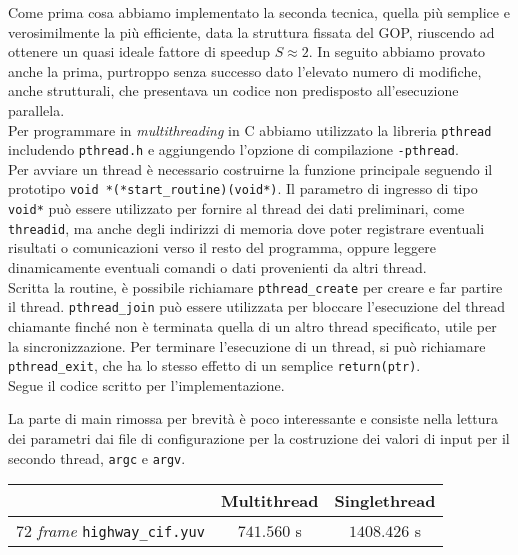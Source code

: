 Come prima cosa abbiamo implementato la seconda tecnica, quella più 
semplice e verosimilmente la più efficiente, data la struttura fissata del GOP, 
riuscendo ad ottenere un quasi ideale fattore di speedup $S \approx 2$. In 
seguito abbiamo provato anche la prima, purtroppo senza successo dato l'elevato 
numero di modifiche, anche strutturali, che presentava un codice non 
predisposto all'esecuzione parallela.
\\Per programmare in \emph{multithreading} in C abbiamo utilizzato la libreria 
\verb|pthread| includendo \verb|pthread.h| e aggiungendo l'opzione di 
compilazione \verb|-pthread|.\\
Per avviare un thread è necessario costruirne la funzione principale seguendo 
il prototipo \verb|void *(*start_routine)(void*)|. Il parametro di ingresso di 
tipo \verb|void*| può essere utilizzato per fornire al thread dei dati 
preliminari, come \verb|threadid|, ma anche degli indirizzi di 
memoria dove poter registrare eventuali risultati o comunicazioni verso 
il resto del programma, oppure leggere dinamicamente eventuali comandi o dati  
provenienti da altri thread. \\
Scritta la routine, è possibile richiamare \verb|pthread_create| per creare e 
far partire il thread. \verb|pthread_join| può essere utilizzata per bloccare 
l'esecuzione del thread chiamante finché non è terminata quella di un altro 
thread specificato, utile per la sincronizzazione. Per terminare l'esecuzione 
di un thread, si può richiamare \verb|pthread_exit|, che ha lo stesso effetto 
di un semplice \verb|return(ptr)|.\\
Segue il codice scritto per l'implementazione.\\
\begin{center}

\end{center}
La parte di main rimossa per brevità è poco interessante e consiste nella 
lettura dei parametri dai file di configurazione per la costruzione dei valori 
di input per il secondo thread, \verb|argc| e \verb|argv|.

\begin{center}
	\begin{tabular}{|r|c|c|}
    \hline
    
		& \textbf{Multithread} & \textbf{Singlethread} \\
    
    \hline
		\hline
    \hline
    
		$72$ \textit{frame} \verb|highway_cif.yuv| & $741.560$ s & $1408.426$ s \\
    
    \hline
	\end{tabular}
\end{center}

